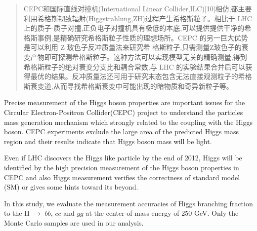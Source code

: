 
\begin{abstract}

CEPC和国际直线对撞机(International Linear Collider,ILC)[10]相仿,都主要利用希格斯韧致辐射(Higgstrahlung,ZH)过程产生希格斯粒子。相比于 LHC 上的质子-质子对撞,正负电子对撞机具有极低的本底,可以提供提供干净的希格斯事例,是精确研究希格斯粒子性质的理想场所。CEPC 的另一巨大优势是可以利用 Z 玻色子反冲质量法来研究希 格斯粒子,只需测量Z玻色子的衰变产物即可探测希格斯粒子。这种方法可以实现模型无关的精确测量,得到希格斯粒子的绝对衰变分支比和耦合常数,与 LHC 的实验结果合并后可以获得最优的结果。反冲质量法还可用于研究末态包含无法直接观测粒子的希格斯衰变道,从而寻找希格斯衰变中可能出现的暗物质和奇异新粒子等。


\end{abstract}

\begin{englishabstract}

Precise measurement of the Higgs boson properties are important issues for the Circular Electron-Positron Collider(CEPC) project to understand the particles mass generation mechanism which strongly related to the coupling with the Higgs boson. CEPC experiments exclude the large area of the predicted Higgs mass region and their results indicate that Higgs boson mass will be light. 

Even if LHC discovers the Higgs like particle by the end of 2012, Higgs will be identified by the high precision measurement of the Higgs boson properties in CEPC and also Higgs measurement verifies the correctness of standard model (SM) or gives some hints toward its beyond. 

In this study, we evaluate the measurement accuracies of Higgs branching fraction to the H $\to$ $b\bar{b}$, $c\bar{c}$ and $gg$ at the center-of-mass energy of 250 GeV. Only the Monte Carlo samples are used in our analysis.


\end{englishabstract}

